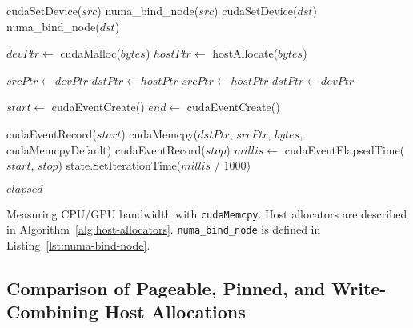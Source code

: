 \begin{algorithm}[H]
	\begin{algorithmic}[1]
		\Statex
		\State cudaSetDevice($src$)
		\Else {}
		\State numa\_bind\_node($src$)
		\EndIf
		\State cudaSetDevice($dst$)
		\Else {}
		\State numa\_bind\_node($dst$)
		\EndIf
		
		\State $devPtr \gets$ cudaMalloc($bytes$) 
		\State $hostPtr \gets$ hostAllocate($bytes$) 

		\State $srcPtr \gets devPtr$
		\State $dstPtr \gets hostPtr$
		\Else {}
		\State $srcPtr \gets hostPtr$
		\State $dstPtr \gets devPtr$
		\EndIf

		\State $start \gets$ cudaEventCreate()
		\State $end \gets$ cudaEventCreate()

		\State cudaEventRecord($start$)
		\State cudaMemcpy($dstPtr$, $srcPtr$, $bytes$, cudaMemcpyDefault)
		\State cudaEventRecord($stop$)
		\State $millis \gets$ cudaEventElapsedTime($start$, $stop$)
		\State state.SetIterationTime($millis$ / $1000$)
        \EndFor
		
		\Return $elapsed$
		\EndFunction
		
	\end{algorithmic}
	\caption[Measuring CPU/GPU bandwidth with \texttt{cudaMemcpy}.]{
		Measuring CPU/GPU bandwidth with \texttt{cudaMemcpy}.
		Host allocators are described in Algorithm~\ref{alg:host-allocators}.
		\texttt{numa\_bind\_node} is defined in Listing~\ref{lst:numa-bind-node}.
	}
	\label{alg:explicit-cpu-gpu}
\end{algorithm}

\subsection{Comparison of Pageable, Pinned, and Write-Combining Host Allocations}
\label{sec:explicit-pageable-pinned-wc}

